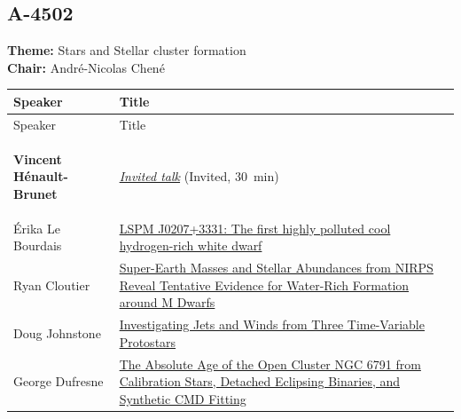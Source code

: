 \hypertarget{schedule-tuesday-morning-a-4502}{}
\subsection*{A-4502}
\textbf{Theme:} Stars and Stellar cluster formation\\
\textbf{Chair:} André-Nicolas Chené\\
{\small
{}
\sloppy
\setlength{\emergencystretch}{1em}
\begin{longtable}{@{}>{\TableRaggedRight\arraybackslash\hspace{0pt}}p{} >{\TableRaggedRight\arraybackslash\hspace{0pt}}p{}@{}}
\toprule
Speaker & Title \\
\midrule
\endfirsthead
\toprule
Speaker & Title \\
\midrule
\endhead
\hypertarget{invited-vincent-henault-brunet-sched}{}\label{invited-page-vincent-henault-brunet-sched}{\bfseries\color{cascagold}Vincent Hénault-Brunet} & \hyperlink{invited-vincent-henault-brunet}{\emph{Invited talk}} {\small\color{cascagold}(Invited, 30~min)} \\
\hypertarget{schedule-talk-26}{}\label{schedule-page-talk-26}Érika Le Bourdais & \hyperlink{abstract-talk-26}{LSPM J0207+3331: The first highly polluted cool hydrogen-rich white dwarf} \\
\hypertarget{schedule-talk-28}{}\label{schedule-page-talk-28}Ryan Cloutier & \hyperlink{abstract-talk-28}{Super-Earth Masses and Stellar Abundances from NIRPS Reveal Tentative Evidence for Water-Rich Formation around M Dwarfs} \\
\hypertarget{schedule-talk-76}{}\label{schedule-page-talk-76}Doug Johnstone & \hyperlink{abstract-talk-76}{Investigating Jets and Winds from Three Time-Variable Protostars} \\
\hypertarget{schedule-talk-70}{}\label{schedule-page-talk-70}George Dufresne & \hyperlink{abstract-talk-70}{The Absolute Age of the Open Cluster NGC 6791 from Calibration Stars, Detached Eclipsing Binaries, and Synthetic CMD Fitting} \\
\bottomrule
\end{longtable}
}

\hypertarget{schedule-tuesday-morning-a-3561}{}
